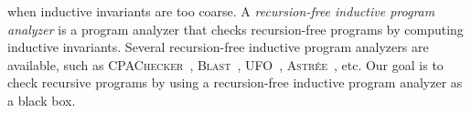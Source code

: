 when inductive invariants are too coarse. 
A \emph{recursion-free
  inductive program analyzer} is a program analyzer that checks
recursion-free programs by computing inductive invariants. Several recursion-free
inductive program analyzers are available, such as \textsc{CPAChecker}~\cite{BeyerK11},
\textsc{Blast}~\cite{BeyerHJM07}, \textsc{UFO}~\cite{AlbarghouthiLGC12}, \textsc{Astr\'ee}~\cite{CousotCFMMMR05}, etc. Our goal is to check
recursive programs by using a recursion-free inductive program analyzer
as a black box.
